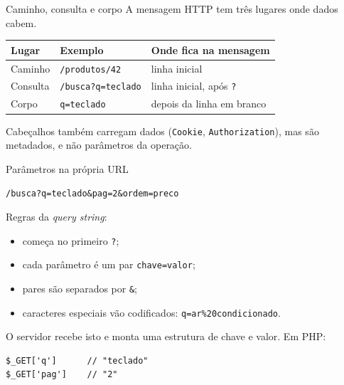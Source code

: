 \documentclass{beamer}
\begin{document}
\begin{frame}{Caminho, consulta e corpo}
  A mensagem HTTP tem três lugares onde dados cabem.

  \begin{center}
    \small
    \begin{tabular}{@{}lll@{}}
      \toprule
      \textbf{Lugar} & \textbf{Exemplo} & \textbf{Onde fica na mensagem} \\
      \midrule
      Caminho   & \texttt{/produtos/42}       & linha inicial \\
      Consulta  & \texttt{/busca?q=teclado}   & linha inicial, após \texttt{?} \\
      Corpo     & \texttt{q=teclado}          & depois da linha em branco \\
      \bottomrule
    \end{tabular}
  \end{center}

  \vspace{0.4cm}
  Cabeçalhos também carregam dados (\texttt{Cookie}, \texttt{Authorization}),
  mas são metadados, e não parâmetros da operação.
\end{frame}

\begin{frame}[fragile]{Parâmetros na própria URL}
  \begin{center}
    \large \texttt{/busca?q=teclado\&pag=2\&ordem=preco}
  \end{center}

  \vspace{0.4cm}
  Regras da \textit{query string}:

  \begin{itemize}
    \item começa no primeiro \texttt{?};
    \item cada parâmetro é um par \texttt{chave=valor};
    \item pares são separados por \texttt{\&};
    \item caracteres especiais vão codificados: \texttt{q=ar\%20condicionado}.
  \end{itemize}

  \vspace{0.3cm}
  O servidor recebe isto e monta uma estrutura de chave e valor. Em PHP:

  \begin{verbatim}
$_GET['q']      // "teclado"
$_GET['pag']    // "2"
  \end{verbatim}
\end{frame}
\end{document}

